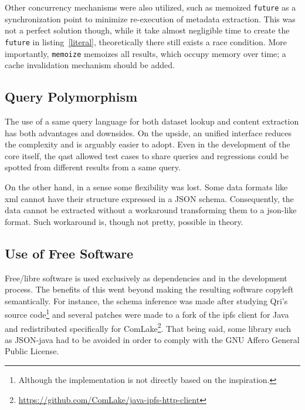 Other concurrency mechanisms were also utilized, such as memoized \verb|future|
as a synchronization point to minimize re-execution of metadata extraction.
This was not a perfect solution though, while it take almost negligible time
to create the \verb|future| in listing~\ref{literal}, theoretically there still
exists a race condition.  More importantly, \verb|memoize| memoizes all results,
which occupy memory over time; a cache invalidation mechanism should be added.

\subsection{Query Polymorphism}
The use of a same query language for both dataset lookup and content extraction
has both advantages and downsides.  On the upside, an unified interface
reduces the complexity and is arguably easier to adopt.  Even in the development
of the core itself, the \gls{qast} allowed test cases to share queries
and regressions could be spotted from different results from a same query.

On the other hand, in a sense some flexibility was lost.  Some data formats
like \gls{xml} cannot have their structure expressed in a JSON schema.
Consequently, the data cannot be extracted without a workaround transforming
them to a \gls{json}-like format.  Such workaround is, though not pretty,
possible in theory.

\subsection{Use of Free Software}
Free/libre software is used exclusively as dependencies and in the development
process.  The benefits of this went beyond making the resulting software
copyleft semantically.  For instance, the schema inference was made after
studying Qri's source code\footnote{Although the implementation is not
directly based on the inspiration.} and several patches were made to a fork
of the \gls{ipfs} client for Java and redistributed specifically for
ComLake\footnote{\url{https://github.com/ComLake/java-ipfs-http-client}}.
That being said, some library such as JSON-java had to be avoided in order
to comply with the GNU Affero General Public License.
